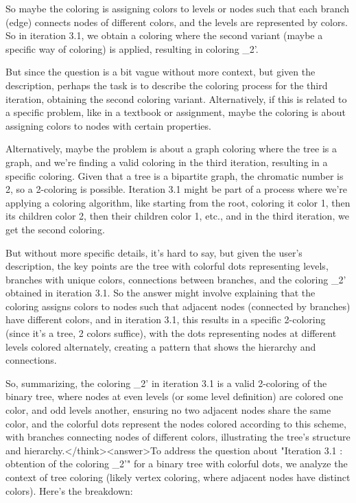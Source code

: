So maybe the coloring is assigning colors to levels or nodes such that each branch (edge) connects nodes of different colors, and the levels are represented by colors. So in iteration 3.1, we obtain a coloring where the second variant (maybe a specific way of coloring) is applied, resulting in coloring _2'.

But since the question is a bit vague without more context, but given the description, perhaps the task is to describe the coloring process for the third iteration, obtaining the second coloring variant. Alternatively, if this is related to a specific problem, like in a textbook or assignment, maybe the coloring is about assigning colors to nodes with certain properties.

Alternatively, maybe the problem is about a graph coloring where the tree is a graph, and we're finding a valid coloring in the third iteration, resulting in a specific coloring. Given that a tree is a bipartite graph, the chromatic number is 2, so a 2-coloring is possible. Iteration 3.1 might be part of a process where we're applying a coloring algorithm, like starting from the root, coloring it color 1, then its children color 2, then their children color 1, etc., and in the third iteration, we get the second coloring.

But without more specific details, it's hard to say, but given the user's description, the key points are the tree with colorful dots representing levels, branches with unique colors, connections between branches, and the coloring _2' obtained in iteration 3.1. So the answer might involve explaining that the coloring assigns colors to nodes such that adjacent nodes (connected by branches) have different colors, and in iteration 3.1, this results in a specific 2-coloring (since it's a tree, 2 colors suffice), with the dots representing nodes at different levels colored alternately, creating a pattern that shows the hierarchy and connections.

So, summarizing, the coloring _2' in iteration 3.1 is a valid 2-coloring of the binary tree, where nodes at even levels (or some level definition) are colored one color, and odd levels another, ensuring no two adjacent nodes share the same color, and the colorful dots represent the nodes colored according to this scheme, with branches connecting nodes of different colors, illustrating the tree's structure and hierarchy.</think><answer>To address the question about "Iteration 3.1 : obtention of the coloring _2'" for a binary tree with colorful dots, we analyze the context of tree coloring (likely vertex coloring, where adjacent nodes have distinct colors). Here’s the breakdown:  

